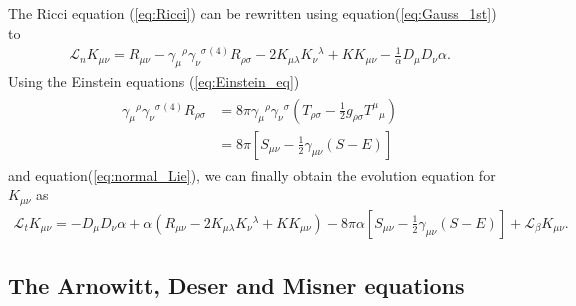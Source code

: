 The Ricci equation (\ref{eq:Ricci}) can be rewritten using equation(\ref{eq:Gauss_1st}) to
\begin{align}
    \mathcal{L}_n K_{\mu\nu} = R_{\mu\nu} - \gamma_{\mu}{}^{\rho} \gamma_\nu{}^{\sigma} {}^{(4)} R_{\rho\sigma} - 2 K_{\mu\lambda} K_\nu{}^{\lambda} + K K_{\mu\nu} - \frac{1}{\alpha} D_\mu D_\nu \alpha.
\end{align}
Using the Einstein equations (\ref{eq:Einstein_eq})
\begin{align}
\begin{split}
    \gamma_{\mu}{}^{\rho} \gamma_\nu{}^{\sigma} {}^{(4)} R_{\rho\sigma} &= 8\pi \gamma_{\mu}{}^{\rho} \gamma_\nu{}^{\sigma} \left( T_{\rho\sigma} - \frac{1}{2}g_{\rho\sigma} T^\mu{}_\mu \right)\\
    &= 8\pi \left[S_{\mu\nu} - \frac{1}{2} \gamma_{\mu\nu} \left(S-E\right) \right]
\end{split}
\end{align}
and equation(\ref{eq:normal_Lie}), we can finally obtain the evolution equation for $K_{\mu\nu}$ as
\begin{align}\label{eq:K_evol}
    \mathcal{L}_t K_{\mu\nu} = - D_\mu D_\nu \alpha + \alpha \left(R_{\mu\nu} - 2K_{\mu\lambda} K_\nu{}^{\lambda} + K K_{\mu\nu} \right) 
    - 8 \pi \alpha \left[ S_{\mu\nu} - \frac{1}{2}\gamma_{\mu\nu} \left(S-E\right) \right] + \mathcal{L}_\beta K_{\mu\nu}.
\end{align}

\subsection{The Arnowitt, Deser and Misner equations} %
\label{section1.2.6}

